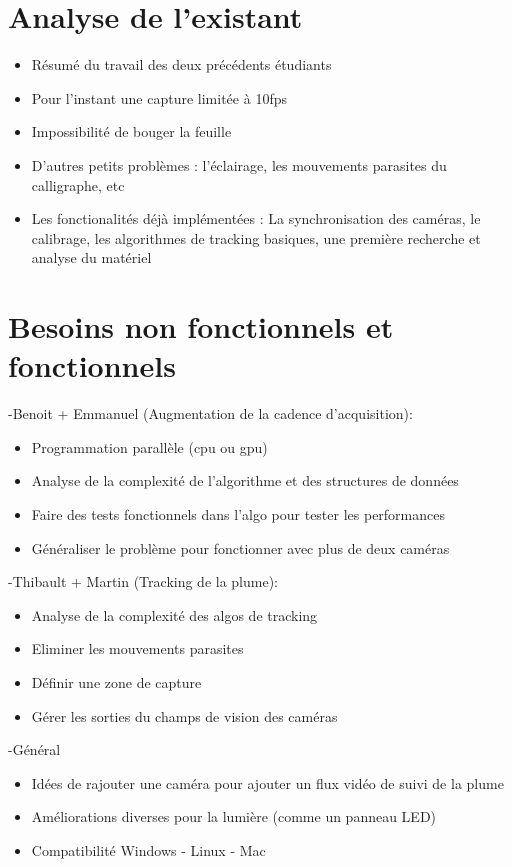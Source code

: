 \documentclass{article}
\begin{document}
\section{Analyse de l'existant}
\begin{itemize}
\item Résumé du travail des deux précédents étudiants
\item Pour l'instant une capture limitée à 10fps
\item Impossibilité de bouger la feuille
\item D'autres petits problèmes : l'éclairage, les mouvements parasites du calligraphe, etc
\item Les fonctionalités déjà implémentées : La synchronisation des caméras, le calibrage, les algorithmes de tracking basiques, une première recherche et analyse du matériel
\end{itemize}
\section{Besoins non fonctionnels et fonctionnels}
-Benoit + Emmanuel (Augmentation de la cadence d'acquisition):
\begin{itemize}
\item Programmation parallèle (cpu ou gpu)
\item Analyse de la complexité de l'algorithme et des structures de données
\item Faire des tests fonctionnels dans l'algo pour tester les performances
\item Généraliser le problème pour fonctionner avec plus de deux caméras
\end{itemize}

-Thibault + Martin (Tracking de la plume):
\begin{itemize}
\item Analyse de la complexité des algos de tracking
\item Eliminer les mouvements parasites
\item Définir une zone de capture
\item Gérer les sorties du champs de vision des caméras
\end{itemize}

-Général
\begin{itemize}
\item Idées de rajouter une caméra pour ajouter un flux vidéo de suivi de la plume
\item Améliorations diverses pour la lumière (comme un panneau LED)
\item Compatibilité Windows - Linux - Mac
\end{itemize}
\end{document}
